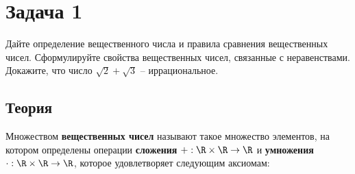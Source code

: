
\section*{Задача 1}

Дайте определение вещественного числа и правила сравнения вещественных чисел. Сформулируйте свойства вещественных чисел, связанные с неравенствами. Докажите, что число $\sqrt{2} + \sqrt{3}$ -- иррациональное.


\subsection*{Теория}

\begin{definition}
	Множеством \textbf{вещественных чисел} называют такое множество элементов, на котором определены операции \textbf{сложения} $+: \R \times \R \rightarrow \R$ и \textbf{умножения} $\cdot: \R \times \R \rightarrow \R$, которое удовлетворяет следующим аксиомам:
\end{definition}
